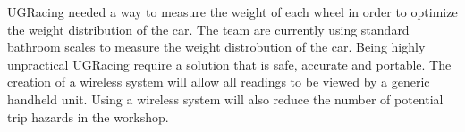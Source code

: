 UGRacing needed a way to measure the weight of each wheel in order to optimize the weight distribution of the car. The team are currently using standard bathroom scales to measure the weight distrobution of the car. Being highly unpractical UGRacing require a solution that is safe, accurate and portable. The creation of a wireless system will allow all readings to be viewed by a generic handheld unit. Using a wireless system will also reduce the number of potential trip hazards in the workshop.


